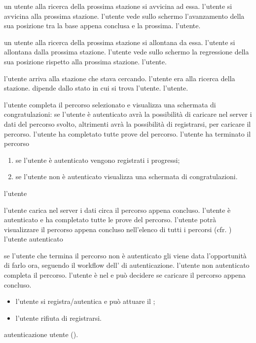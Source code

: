 \desc un utente alla ricerca della prossima stazione si avvicina ad essa.
\pre l'utente si avvicina alla prossima stazione.
\post l'utente vede sullo schermo l'avanzamento della sua posizione tra la base appena conclusa e la prossima.
\att l'utente.

\desc un utente alla ricerca della prossima stazione si allontana da essa.
\pre l'utente si allontana dalla prossima stazione.
\post l'utente vede sullo schermo la regressione della sua posizione rispetto alla prossima stazione.
\att l'utente.

\desc l'utente arriva alla stazione che stava cercando.
\pre l'utente era alla ricerca della stazione.
\post dipende dallo stato in cui si trova l'utente.
\att l'utente.

\desc l'utente completa il percorso selezionato e visualizza una schermata di congratulazioni: se l'utente è autenticato avrà la possibilità di caricare nel server i dati del percorso svolto, altrimenti avrà la possibilità di registrarsi, per caricare il percorso.
\pre l'utente ha completato tutte prove del percorso.
\post l'utente ha terminato il percorso
\scen
  \begin{enumerate}
    \item \textbf{} se l'utente è autenticato vengono registrati i progressi;
    \item \textbf{} se l'utente non è autenticato visualizza una schermata di congratulazioni.
  \end{enumerate}
\att l'utente

\desc l'utente carica nel server i dati circa il percorso appena concluso.
\pre l'utente è autenticato e ha completato tutte le prove del percorso.
\post l'utente potrà visualizzare il percorso appena concluso nell'elenco di tutti i percorsi (cfr. )
\att l'utente autenticato

\desc se l'utente che termina il percorso non è autenticato gli viene data l'opportunità di farlo ora, seguendo il workflow dell' di autenticazione.
\pre l'utente non autenticato completa il percorso.
\post l'utente è nel  e può decidere se caricare il percorso appena concluso.
\scen
  \begin{itemize}
    \item l'utente si registra/autentica e può attuare il ;
    \item l'utente rifiuta di registrarsi.
  \end{itemize}
\ext autenticazione utente ().
